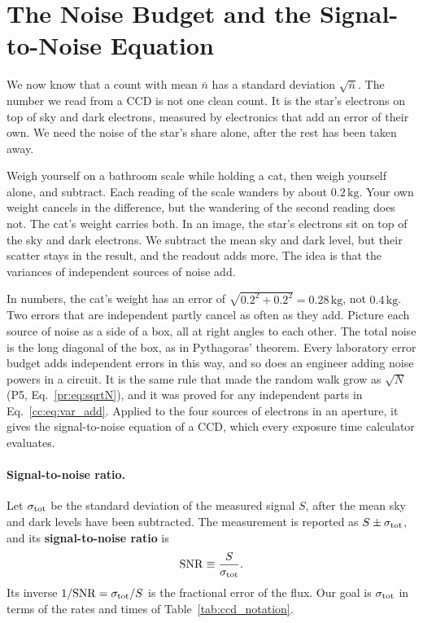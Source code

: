 \section{The Noise Budget and the Signal-to-Noise Equation}
\label{cc:sec:budget}

We now know that a count with mean $\bar n$ has a standard deviation $\sqrt{\bar n}$. The number we read from a CCD is not one clean count. It is the star's electrons on top of sky and dark electrons, measured by electronics that add an error of their own. We need the noise of the star's share alone, after the rest has been taken away.

Weigh yourself on a bathroom scale while holding a cat, then weigh yourself alone, and subtract. Each reading of the scale wanders by about $0.2\,\mathrm{kg}$. Your own weight cancels in the difference, but the wandering of the second reading does not. The cat's weight carries both. In an image, the star's electrons sit on top of the sky and dark electrons. We subtract the mean sky and dark level, but their scatter stays in the result, and the readout adds more. The idea is that the variances of independent sources of noise add.

In numbers, the cat's weight has an error of $\sqrt{0.2^2+0.2^2}=0.28\,\mathrm{kg}$, not $0.4\,\mathrm{kg}$. Two errors that are independent partly cancel as often as they add. Picture each source of noise as a side of a box, all at right angles to each other. The total noise is the long diagonal of the box, as in Pythagoras' theorem. Every laboratory error budget adds independent errors in this way, and so does an engineer adding noise powers in a circuit. It is the same rule that made the random walk grow as $\sqrt N$ (P5, Eq.~\eqref{pr:eq:sqrtN}), and it was proved for any independent parts in Eq.~\eqref{cc:eq:var_add}. Applied to the four sources of electrons in an aperture, it gives the signal-to-noise equation of a CCD, which every exposure time calculator evaluates.

\paragraph{Signal-to-noise ratio.} Let $\sigma_{\rm tot}$ be the standard deviation of the measured signal $S$, after the mean sky and dark levels have been subtracted. The measurement is reported as $S\pm\sigma_{\rm tot}$, and its \textbf{signal-to-noise ratio} is
\begin{equation}
	\mathrm{SNR} \equiv \frac{S}{\sigma_{\rm tot}}.
	\label{eq:snr_def}
\end{equation}
Its inverse $1/\mathrm{SNR}=\sigma_{\rm tot}/S$ is the fractional error of the flux. Our goal is $\sigma_{\rm tot}$ in terms of the rates and times of Table~\ref{tab:ccd_notation}.


